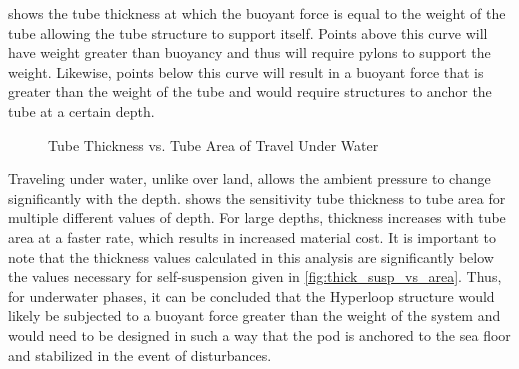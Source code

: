  shows the tube thickness at which the buoyant force is equal to the weight of the tube allowing the tube structure to support itself. Points above this curve will have weight greater than buoyancy and thus will require pylons to support the weight. Likewise, points below this curve will result in a buoyant force that is greater than the weight of the tube and would require structures to anchor the tube at a certain depth.

\begin{figure}
	\centering
	\caption{Tube Thickness vs. Tube Area of Travel Under Water}
	\label{fig:tube_thick_vs_tube_area_underwater}
\end{figure}

Traveling under water, unlike over land, allows the ambient pressure to change significantly with the depth.  shows the sensitivity tube thickness to tube area for multiple different values of depth. For large depths, thickness increases with tube area at a faster rate, which results in increased material cost. It is important to note that the thickness values calculated in this analysis are significantly below the values necessary for self-suspension given in \cref{fig:thick_susp_vs_area}. Thus, for underwater phases, it can be concluded that the Hyperloop structure would likely be subjected to a buoyant force greater than the weight of the system and would need to be designed in such a way that the pod is anchored to the sea floor and stabilized in the event of disturbances.
